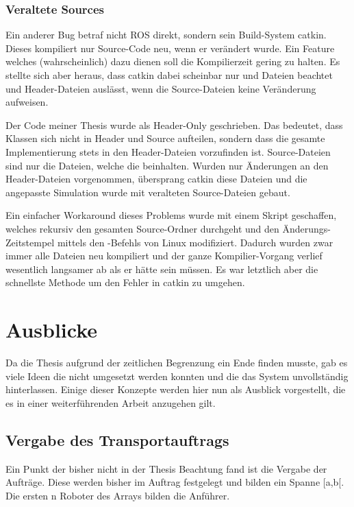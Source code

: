 \subsubsection*{Veraltete Sources}
Ein anderer Bug betraf nicht \ac{ROS} direkt, sondern sein Build-System catkin. Dieses kompiliert nur Source-Code neu, wenn er verändert wurde. Ein Feature welches (wahrscheinlich) dazu dienen soll die Kompilierzeit gering zu halten. Es stellte sich aber heraus, dass catkin dabei scheinbar nur  und  Dateien beachtet und Header-Dateien auslässt, wenn die Source-Dateien keine Veränderung aufweisen.

Der Code meiner Thesis wurde als Header-Only geschrieben. Das bedeutet, dass Klassen sich nicht in Header und Source aufteilen, sondern dass die gesamte Implementierung stets in den Header-Dateien vorzufinden ist. Source-Dateien sind nur die Dateien, welche die  beinhalten. Wurden nur Änderungen an den Header-Dateien vorgenommen, übersprang catkin diese Dateien und die angepasste Simulation wurde mit veralteten Source-Dateien gebaut.

Ein einfacher Workaround dieses Problems wurde mit einem Skript geschaffen, welches rekursiv den gesamten Source-Ordner durchgeht und den Änderungs-Zeitstempel mittels den -Befehls\cite{Ubuntu_touch} von Linux modifiziert. Dadurch wurden zwar immer alle Dateien neu kompiliert und der ganze Kompilier-Vorgang verlief wesentlich langsamer ab als er hätte sein müssen. Es war letztlich aber die schnellste Methode um den Fehler in catkin zu umgehen.





\newpage\section{Ausblicke}

Da die Thesis aufgrund der zeitlichen Begrenzung ein Ende finden musste, gab es viele Ideen die nicht umgesetzt werden konnten und die das System unvollständig hinterlassen. Einige dieser Konzepte werden hier nun als Ausblick vorgestellt, die es in einer weiterführenden Arbeit anzugehen gilt.

\subsection*{Vergabe des Transportauftrags}

Ein Punkt der bisher nicht in der Thesis Beachtung fand ist die Vergabe der Aufträge. Diese werden bisher im Auftrag festgelegt und bilden ein Spanne [a,b[. Die ersten n Roboter des Arrays bilden die Anführer.

